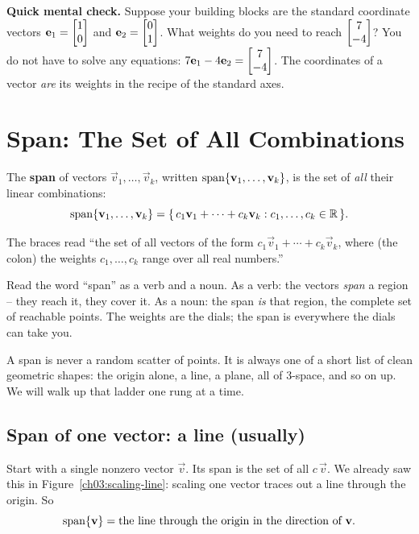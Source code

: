 \textbf{Quick mental check.} Suppose your building blocks are the standard coordinate vectors $\mathbf{e}_1 = \begin{bmatrix}1\\0\end{bmatrix}$ and $\mathbf{e}_2 = \begin{bmatrix}0\\1\end{bmatrix}$. What weights do you need to reach $\begin{bmatrix}7\\-4\end{bmatrix}$? You do not have to solve any equations: $7\mathbf{e}_1 - 4\mathbf{e}_2 = \begin{bmatrix}7\\-4\end{bmatrix}$. The coordinates of a vector \emph{are} its weights in the recipe of the standard axes.

\section{Span: The Set of All Combinations}

\begin{definition}[Span]\label{ch03:def-span}
The \textbf{span} of vectors $\vec{v}_1,\dots,\vec{v}_k$, written $\operatorname{span}\{\mathbf{v}_1,\dots,\mathbf{v}_k\}$, is the set of \emph{all} their linear combinations:
\[
  \operatorname{span}\{\mathbf{v}_1,\dots,\mathbf{v}_k\}
  = \{\, c_1\mathbf{v}_1 + \cdots + c_k\mathbf{v}_k : c_1,\dots,c_k \in \mathbb{R} \,\}.
\]
\end{definition}

The braces read ``the set of all vectors of the form $c_1\vec{v}_1 + \cdots + c_k\vec{v}_k$, where (the colon) the weights $c_1,\dots,c_k$ range over all real numbers.''

Read the word ``span'' as a verb and a noun. As a verb: the vectors \emph{span} a region -- they reach it, they cover it. As a noun: the span \emph{is} that region, the complete set of reachable points. The weights are the dials; the span is everywhere the dials can take you.

A span is never a random scatter of points. It is always one of a short list of clean geometric shapes: the origin alone, a line, a plane, all of $3$-space, and so on up. We will walk up that ladder one rung at a time.

\subsection{Span of one vector: a line (usually)}

Start with a single nonzero vector $\vec{v}$. Its span is the set of all $c\,\vec{v}$. We already saw this in Figure~\ref{ch03:scaling-line}: scaling one vector traces out a line through the origin. So
\[
  \operatorname{span}\{\mathbf{v}\} = \text{the line through the origin in the direction of } \mathbf{v}.
\]

